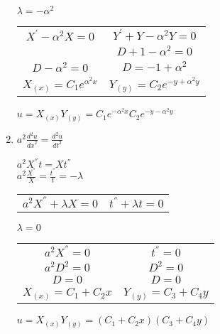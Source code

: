 \documentclass[10pt,a4paper]{article}
\begin{document}
\begin{enumerate}
\begin{center}
$\lambda=-\alpha^2$
\end{center}

\begin{center}
\begin{tabular}{c c} 
 
${ X }^{ ' }-{ \alpha  }^{ 2 }X=0$ & ${ Y }^{ ' }+Y-{\alpha}^2 Y=0$   \\ 
                                   & $D+1-{\alpha}^2=0$  \\ 
$D-{ \alpha  }^{ 2 }=0$ & $D=-1+{\alpha}^2$  \\ 
$X_{(x)}=C_1 e^{{\alpha}^2 x}$ & $Y_{(y)}=C_2 e^{-y+{\alpha}^2 y}$  \\ 
\end{tabular}
\end{center}
$u=X_{(x)} Y_{(y)}=C_1 e^{-{\alpha}^2 x} C_2 e^{-y-{\alpha}^2 y}$

\item $a^2 \frac{d^2u}{{dx}^2}=\frac{d^2u}{{dt}^2}$ 

\begin{center}
${ a }^{ 2 } { X }^{ '' }t=X{ t }^{ '' }$\\$ { a }^{ 2 } \frac { { X }^{ '' } }{ X } = \frac { t^{ '' } }{ t } =- \lambda $
\end{center}

\begin{center}
\begin{tabular}{c c} 
 ${ a }^{ 2 }{ X }^{ '' }+\lambda X=0$ & $t^{ '' }+ \lambda t=0$   \\ 
 \end{tabular}
\end{center}





\begin{center}
$\lambda=0$
\end{center}
\begin{center}
\begin{tabular}{c c} 
 
$a^2{ X }^{ '' }=0$ & ${ t }^{ '' }=0$   \\ 
$a^2D^2=0$ & $D^2=0$  \\ 
$D=0$  & $D=0$  \\ 
$X_{(x)}=C_1+C_2x$ & $Y_{(y)}=C_3+C_4y$  \\ 
\end{tabular}
\end{center}
$u=X_{(x)} Y_{(y)}=(C_1+C_2x)(C_3+C_4y)$



\end{enumerate}
\end{document}
